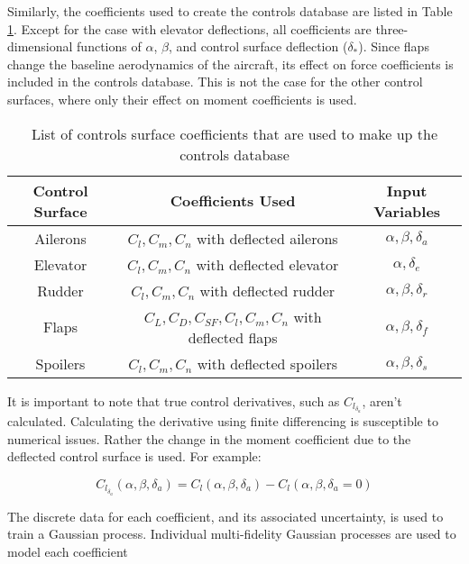 Similarly, the coefficients used to create the controls database are listed in Table \ref{tab:control_db}. Except for the case with elevator deflections, all coefficients are three-dimensional functions of $\alpha$, $\beta$, and control surface deflection ($\delta_*$). Since flaps change the baseline aerodynamics of the aircraft, its effect on force coefficients is included in the controls database. This is not the case for the other control surfaces, where only their effect on moment coefficients is used. 

\begin{table}[]
    \renewcommand{\arraystretch}{1.2}
    \centering
    \begin{tabular}{ c|c|c } 
         Control Surface & Coefficients Used & Input Variables \\ 
         \hline
         Ailerons & $C_l, C_m, C_n$ with deflected ailerons & $\alpha, \beta, \delta_a$  \\
         Elevator & $C_l, C_m, C_n$ with deflected elevator & $\alpha, \delta_e$  \\
         Rudder & $C_l, C_m, C_n$ with deflected rudder & $\alpha, \beta, \delta_r$  \\
         Flaps & $C_L, C_D, C_{SF}, C_l, C_m, C_n$ with deflected flaps & $\alpha, \beta, \delta_f$  \\
         Spoilers & $C_l, C_m, C_n$ with deflected spoilers & $\alpha, \beta, \delta_s$  \\
    \end{tabular}
    \caption{List of controls surface coefficients that are used to make up the controls database}
    \label{tab:control_db}
\end{table}

It is important to note that true control derivatives, such as $C_{l_{\delta_a}}$, aren't calculated. Calculating the derivative using finite differencing is susceptible to numerical issues. Rather the change in the moment coefficient due to the deflected control surface is used. For example: 

\begin{equation}\label{equ:control_derivative}
    C_{l_{\delta_a}}(\alpha,\beta,\delta_a) = C_l(\alpha,\beta,\delta_a) - C_l(\alpha,\beta,\delta_a=0)
\end{equation}

The discrete data for each coefficient, and its associated uncertainty, is used to train a Gaussian process. Individual multi-fidelity Gaussian processes are used to model each coefficient 